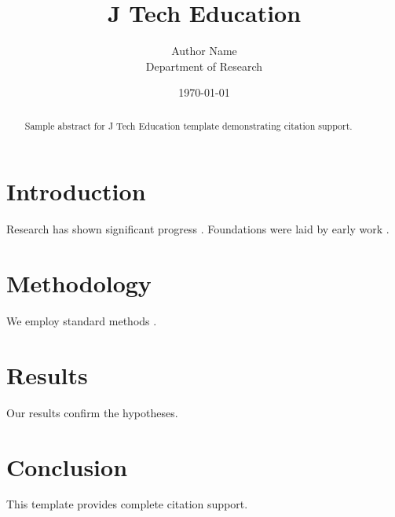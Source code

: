 \documentclass{aip-cp}
\title{J Tech Education}
\author{Author Name \\ \small Department of Research}
\date{\today}
\begin{document}
\maketitle

\begin{abstract}
Sample abstract for J Tech Education template demonstrating citation support.
\end{abstract}

\section{Introduction}
Research has shown significant progress \citep{einstein1905}. Foundations were laid by early work \citep{turing1950}.

\section{Methodology}
We employ standard methods \citep{knuth1984}.

\section{Results}
Our results confirm the hypotheses.

\section{Conclusion}
This template provides complete citation support.



\end{document}
